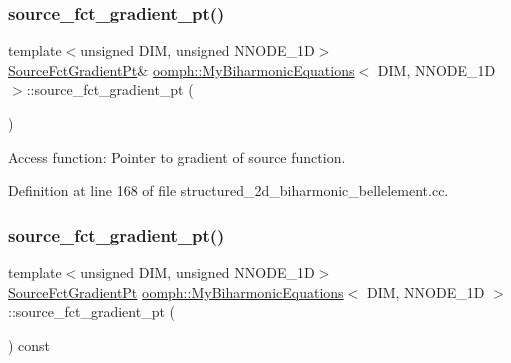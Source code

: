 \subsubsection{\texorpdfstring{source\+\_\+fct\+\_\+gradient\+\_\+pt()}{source\_fct\_gradient\_pt()}\hspace{0.1cm}{\footnotesize\ttfamily [1/2]}}
{\footnotesize\ttfamily template$<$unsigned D\+IM, unsigned N\+N\+O\+D\+E\+\_\+1D$>$ \\
\hyperlink{classoomph_1_1MyBiharmonicEquations_af007c03701e888fed7375cb4537f0046}{Source\+Fct\+Gradient\+Pt}\& \hyperlink{classoomph_1_1MyBiharmonicEquations}{oomph\+::\+My\+Biharmonic\+Equations}$<$ D\+IM, N\+N\+O\+D\+E\+\_\+1D $>$\+::source\+\_\+fct\+\_\+gradient\+\_\+pt (\begin{DoxyParamCaption}{ }\end{DoxyParamCaption})\hspace{0.3cm}{\ttfamily [inline]}}



Access function\+: Pointer to gradient of source function. 



Definition at line 168 of file structured\+\_\+2d\+\_\+biharmonic\+\_\+bellelement.\+cc.

\mbox{\label{classoomph_1_1MyBiharmonicEquations_a3c6a713fdc0847a374c58ef4760046ec}} 
\subsubsection{\texorpdfstring{source\+\_\+fct\+\_\+gradient\+\_\+pt()}{source\_fct\_gradient\_pt()}\hspace{0.1cm}{\footnotesize\ttfamily [2/2]}}
{\footnotesize\ttfamily template$<$unsigned D\+IM, unsigned N\+N\+O\+D\+E\+\_\+1D$>$ \\
\hyperlink{classoomph_1_1MyBiharmonicEquations_af007c03701e888fed7375cb4537f0046}{Source\+Fct\+Gradient\+Pt} \hyperlink{classoomph_1_1MyBiharmonicEquations}{oomph\+::\+My\+Biharmonic\+Equations}$<$ D\+IM, N\+N\+O\+D\+E\+\_\+1D $>$\+::source\+\_\+fct\+\_\+gradient\+\_\+pt (\begin{DoxyParamCaption}{ }\end{DoxyParamCaption}) const\hspace{0.3cm}{\ttfamily [inline]}}



